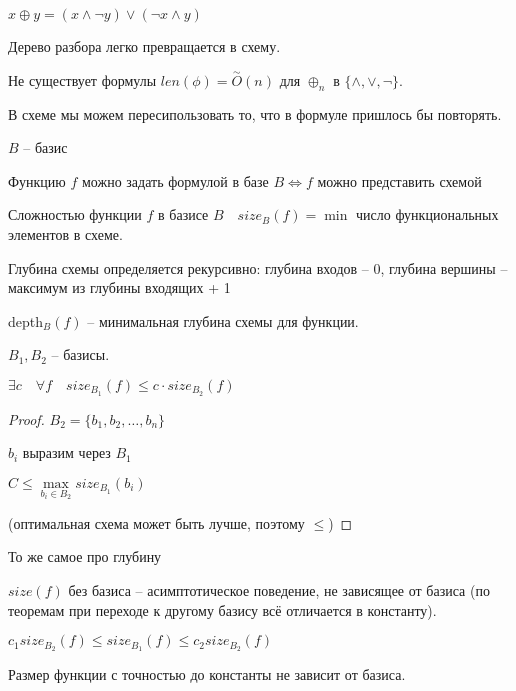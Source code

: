 \documentclass{book}
\theoremstyle{definition}
\begin{document}
$x\oplus y = (x\land \neg y) \lor (\neg x \land y)$

Дерево разбора легко превращается в схему.
\begin{theorem}
    Не существует формулы $len(\phi) = \overset{\sim }O(n)$ для $\oplus_n$ в $\{\land, \lor, \neg\}$.
\end{theorem}
В схеме мы можем пересипользовать то, что в формуле пришлось бы повторять.

$B$ -- базис

 \begin{theorem}
     Функцию $f$ можно задать формулой в базе $B \iff  f$ можно представить схемой 
 \end{theorem}

 \begin{definition}
     Сложностью функции $f$ в базисе $B\quad size_B(f) = \min$ число функциональных элементов в схеме.
 \end{definition}
 \begin{definition}
     Глубина схемы определяется рекурсивно: глубина входов -- 0, глубина вершины -- максимум из глубины входящих + 1

     depth$_B(f)$ -- минимальная глубина схемы для функции.
 \end{definition}

 \begin{theorem}
        $B_1, B_2$ -- базисы.

        $\exists c\quad\forall f\quad size_{B_1}(f) \leqslant c\cdot size_{B_2}(f)$
 \end{theorem}
 \begin{proof}
     $B_2 = \{b_1, b_2, \ldots, b_n\}$

     $b_i$ выразим через $B_1$

     $C\leqslant \max\limits_{b_i\in B_2} size_{B_1}(b_i)$

     (оптимальная схема может быть лучше, поэтому $\leqslant $)
 \end{proof}
 \begin{theorem}
     То же самое про глубину
 \end{theorem}
\begin{corollary}
    $size(f)$ без базиса -- асимптотическое поведение, не зависящее от базиса (по теоремам при переходе к другому базису всё отличается в константу). 
\end{corollary}
\begin{corollary}
    $c_1 size_{B_2}(f) \leqslant size_{B_1}(f) \leqslant  c_2 size_{B_2}(f)$

    Размер функции с точностью до константы не зависит от базиса.
\end{corollary}
\end{document}
